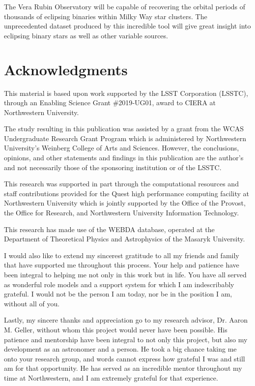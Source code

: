 \documentclass[twocolumn]{aastex63}
\begin{document}
The Vera Rubin Observatory will be capable of recovering the orbital periods of thousands of eclipsing binaries within Milky Way star clusters. The unprecedented dataset produced by this incredible tool will give great insight into eclipsing binary stars as well as other variable sources.


\section{Acknowledgments}
This material is based upon work supported by the LSST Corporation (LSSTC), through an Enabling Science Grant \#2019‐UG01, award to CIERA at Northwestern University.

The study resulting in this publication was assisted by a grant from the WCAS Undergraduate Research Grant Program which is administered by Northwestern University's Weinberg College of Arts and Sciences. However, the conclusions, opinions, and other statements and findings in this publication are the author's and not necessarily those of the sponsoring institution or of the LSSTC.

This research was supported in part through the computational resources and staff contributions provided for the Quest high performance computing facility at Northwestern University which is jointly supported by the Office of the Provost, the Office for Research, and Northwestern University Information Technology.

This research has made use of the WEBDA database, operated at the Department of Theoretical Physics and Astrophysics of the Masaryk University. 

I would also like to extend my sincerest gratitude to all my friends and family that have supported me throughout this process. Your help and patience have been integral to helping me not only in this work but in life. You have all served as wonderful role models and a support system for which I am indescribably grateful. I would not be the person I am today, nor be in the position I am, without all of you.

Lastly, my sincere thanks and appreciation go to my research advisor, Dr. Aaron M. Geller, without whom this project would never have been possible. His patience and mentorship have been integral to not only this project, but also my development as an astronomer and a person. He took a big chance taking me onto your research group, and words cannot express how grateful I was and still am for that opportunity. He has served as an incredible mentor throughout my time at Northwestern, and I am extremely grateful for that experience.
\end{document}
